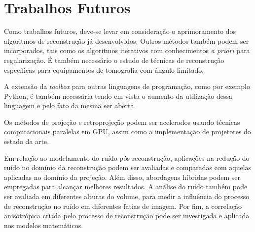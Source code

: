 \chapter[Trabalhos Futuros]{Trabalhos Futuros}\label{Capitulo8}

Como trabalhos futuros, deve-se levar em consideração o aprimoramento dos algoritmos de reconstrução já desenvolvidos. Outros métodos também podem ser incorporados, tais como os algoritmos iterativos com conhecimentos \textit{a priori} para regularização. É também necessário o estudo de técnicas de reconstrução específicas para equipamentos de tomografia com ângulo limitado.

A extensão da \textit{toolbox} para outras linguagens de programação, como por exemplo Python, é também necessária tendo em vista o aumento da utilização dessa linguagem e pelo fato da mesma ser aberta.

Os métodos de projeção e retroprojeção podem ser acelerados usando técnicas computacionais paralelas em \acs{GPU}, assim como a implementação de projetores do estado da arte.  

Em relação ao modelamento do ruído pós-reconstrução, aplicações na redução do ruído no domínio da reconstrução podem ser avaliadas e comparadas com aquelas aplicadas no domínio da projeção. Além disso, abordagens híbridas podem ser empregadas para alcançar melhores resultados. A análise do ruído também pode ser avaliada em diferentes alturas do volume, para medir a influência do processo de reconstrução no ruído em diferentes fatias de imagem. Por fim, a correlação anisotrópica criada pelo processo de reconstrução pode ser investigada e aplicada nos modelos matemáticos.
